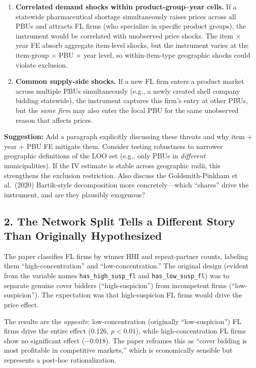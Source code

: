 \documentclass[12pt]{article}
\begin{document}
\begin{enumerate}[]
  \item \textbf{Correlated demand shocks within product-group--year cells.}
    If a statewide pharmaceutical shortage simultaneously raises prices
    across all PBUs and attracts FL firms (who specialize in specific
    product groups), the instrument would be correlated with unobserved
    price shocks. The item $\times$ year FE absorb aggregate item-level
    shocks, but the instrument varies at the item-group $\times$ PBU
    $\times$ year level, so within-item-type geographic shocks could
    violate exclusion.

  \item \textbf{Common supply-side shocks.}
    If a new FL firm enters a product market across multiple PBUs
    simultaneously (e.g., a newly created shell company bidding
    statewide), the instrument captures this firm's entry at other PBUs,
    but the \emph{same firm} may also enter the focal PBU for the same
    unobserved reason that affects prices.
\end{enumerate}

\noindent\textbf{Suggestion:} Add a paragraph explicitly discussing
these threats and why item + year + PBU FE mitigate them. Consider
testing robustness to narrower geographic definitions of the LOO set
(e.g., only PBUs in \emph{different} municipalities). If the IV estimate
is stable across geographic radii, this strengthens the exclusion
restriction. Also discuss the Goldsmith-Pinkham et al.\ (2020)
Bartik-style decomposition more concretely---which ``shares'' drive the
instrument, and are they plausibly exogenous?

\subsection*{2. The Network Split Tells a Different Story Than Originally Hypothesized}

The paper classifies FL firms by winner HHI and repeat-partner counts,
labeling them ``high-concentration'' and ``low-concentration.'' The
original design (evident from the variable names \texttt{has\_high\_susp\_fl}
and \texttt{has\_low\_susp\_fl}) was to separate genuine cover bidders
(``high-suspicion'') from incompetent firms (``low-suspicion''). The
expectation was that high-suspicion FL firms would drive the price effect.

The results are the \emph{opposite}: low-concentration (originally
``low-suspicion'') FL firms drive the entire effect (0.126, $p < 0.01$),
while high-concentration FL firms show no significant effect ($-0.018$).
The paper reframes this as ``cover bidding is most profitable in
competitive markets,'' which is economically sensible but represents a
post-hoc rationalization.
\end{document}
